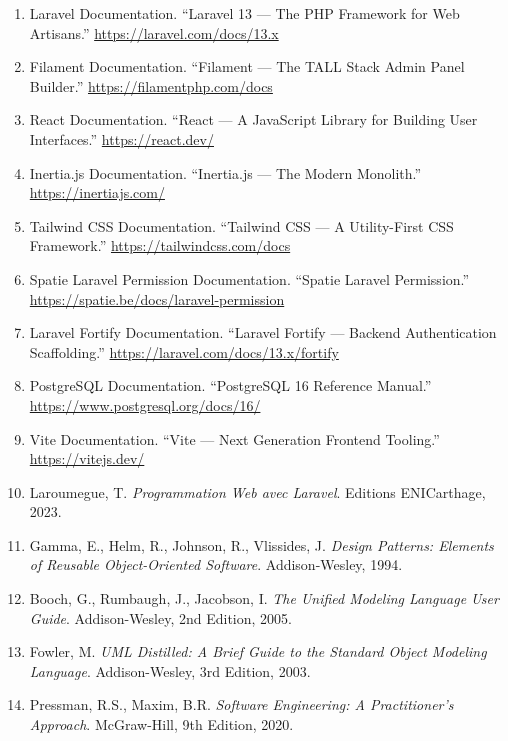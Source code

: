 \documentclass{bts-report}
\begin{document}
\begin{enumerate}
  \item Laravel Documentation. ``Laravel 13 --- The PHP Framework for Web Artisans.'' \url{https://laravel.com/docs/13.x}
  \item Filament Documentation. ``Filament --- The TALL Stack Admin Panel Builder.'' \url{https://filamentphp.com/docs}
  \item React Documentation. ``React --- A JavaScript Library for Building User Interfaces.'' \url{https://react.dev/}
  \item Inertia.js Documentation. ``Inertia.js --- The Modern Monolith.'' \url{https://inertiajs.com/}
  \item Tailwind CSS Documentation. ``Tailwind CSS --- A Utility-First CSS Framework.'' \url{https://tailwindcss.com/docs}
  \item Spatie Laravel Permission Documentation. ``Spatie Laravel Permission.'' \url{https://spatie.be/docs/laravel-permission}
  \item Laravel Fortify Documentation. ``Laravel Fortify --- Backend Authentication Scaffolding.'' \url{https://laravel.com/docs/13.x/fortify}
  \item PostgreSQL Documentation. ``PostgreSQL 16 Reference Manual.'' \url{https://www.postgresql.org/docs/16/}
  \item Vite Documentation. ``Vite --- Next Generation Frontend Tooling.'' \url{https://vitejs.dev/}
  \item Laroumegue, T. \textit{Programmation Web avec Laravel}. Editions ENICarthage, 2023.
  \item Gamma, E., Helm, R., Johnson, R., Vlissides, J. \textit{Design Patterns: Elements of Reusable Object-Oriented Software}. Addison-Wesley, 1994.
  \item Booch, G., Rumbaugh, J., Jacobson, I. \textit{The Unified Modeling Language User Guide}. Addison-Wesley, 2nd Edition, 2005.
  \item Fowler, M. \textit{UML Distilled: A Brief Guide to the Standard Object Modeling Language}. Addison-Wesley, 3rd Edition, 2003.
  \item Pressman, R.S., Maxim, B.R. \textit{Software Engineering: A Practitioner's Approach}. McGraw-Hill, 9th Edition, 2020.
\end{enumerate}

\annexessection
\end{document}
